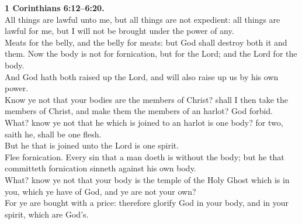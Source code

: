 \documentclass[10pt]{article} %
\begin{document}
{\begin{minipage}[t]{0.45\textwidth}
\textbf{1 Corinthians 6:12--6:20.}\\
All things are lawful unto me, but all things are not expedient: all things are lawful for me, but I will not be brought under the power of any.\\
Meats for the belly, and the belly for meats: but God shall destroy both it and them. Now the body is not for fornication, but for the Lord; and the Lord for the body.\\
And God hath both raised up the Lord, and will also raise up us by his own power.\\
Know ye not that your bodies are the members of Christ? shall I then take the members of Christ, and make them the members of an harlot? God forbid.\\
What? know ye not that he which is joined to an harlot is one body? for two, saith he, shall be one flesh.\\
But he that is joined unto the Lord is one spirit.\\
Flee fornication. Every sin that a man doeth is without the body; but he that committeth fornication sinneth against his own body.\\
What? know ye not that your body is the temple of the Holy Ghost which is in you, which ye have of God, and ye are not your own?\\
For ye are bought with a price: therefore glorify God in your body, and in your spirit, which are God's.\\

\end{minipage}}
\vspace*{\fill}
\newpage
\Huge%
\vspace*{\fill}
\begin{spacing}{1.3}%
\end{spacing}
\vspace*{\fill}
\end{document}
